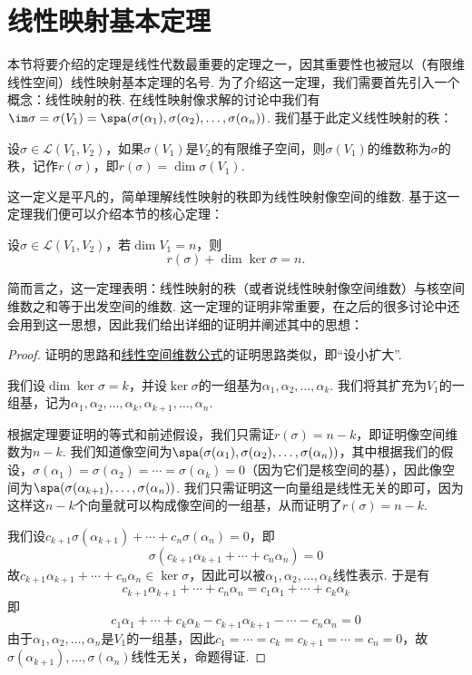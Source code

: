 \section{线性映射基本定理}

本节将要介绍的定理是线性代数最重要的定理之一，因其重要性也被冠以（有限维线性空间）线性映射基本定理的名号. 为了介绍这一定理，我们需要首先引入一个概念：线性映射的秩. 在线性映射像求解的讨论中我们有$\im \sigma=\sigma(V_1)=\spa(\sigma(\alpha_1),\sigma(\alpha_2),\ldots,\sigma(\alpha_n))$. 我们基于此定义线性映射的秩：
\begin{definition}
    设$\sigma\in \mathcal{L}(V_1,V_2)$，如果$\sigma(V_1)$是$V_2$的有限维子空间，则$\sigma(V_1)$的维数称为$\sigma$的秩，记作$r(\sigma)$，即$r(\sigma)=\dim \sigma(V_1)$.
\end{definition}

这一定义是平凡的，简单理解线性映射的秩即为线性映射像空间的维数. 基于这一定理我们便可以介绍本节的核心定理：

\begin{theorem}[线性映射基本定理]\label{thm:6:线性映射基本定理}
    设$\sigma \in \mathcal{L}(V_1,V_2)$，若$\dim V_1=n$，则
    \[r(\sigma)+\dim\ker\sigma=n.\]
\end{theorem}
简而言之，这一定理表明：线性映射的秩（或者说线性映射像空间维数）与核空间维数之和等于出发空间的维数. 这一定理的证明非常重要，在之后的很多讨论中还会用到这一思想，因此我们给出详细的证明并阐述其中的思想：

\begin{proof}
    证明的思路和\hyperref[thm:4:维数公式]{线性空间维数公式}的证明思路类似，即``设小扩大''.

    我们设$\dim\ker\sigma=k$，并设$\ker\sigma$的一组基为$\alpha_1,\alpha_2,\ldots,\alpha_k$. 我们将其扩充为$V_1$的一组基，记为$\alpha_1,\alpha_2,\ldots,\alpha_k,\alpha_{k+1},\ldots,\alpha_n$.

    根据定理要证明的等式和前述假设，我们只需证$r(\sigma)=n-k$，即证明像空间维数为$n-k$. 我们知道像空间为$\spa(\sigma(\alpha_1),\sigma(\alpha_2),\ldots,\sigma(\alpha_n))$，其中根据我们的假设，$\sigma(\alpha_1)=\sigma(\alpha_2)=\cdots=\sigma(\alpha_k)=0$（因为它们是核空间的基），因此像空间为$\spa(\sigma(\alpha_{k+1}),\ldots,\sigma(\alpha_n))$. 我们只需证明这一向量组是线性无关的即可，因为这样这$n-k$个向量就可以构成像空间的一组基，从而证明了$r(\sigma)=n-k$.

    我们设$c_{k+1}\sigma(\alpha_{k+1})+\cdots+c_n\sigma(\alpha_n)=0$，即
    \[\sigma(c_{k+1}\alpha_{k+1}+\cdots+c_n\alpha_n)=0\]
    故$c_{k+1}\alpha_{k+1}+\cdots+c_n\alpha_n \in \ker\sigma$，因此可以被$\alpha_1,\alpha_2,\ldots,\alpha_k$线性表示. 于是有
    \[c_{k+1}\alpha_{k+1}+\cdots+c_n\alpha_n=c_1\alpha_1+\cdots+c_k\alpha_k\]
    即
    \[c_1\alpha_1+\cdots+c_k\alpha_k-c_{k+1}\alpha_{k+1}-\cdots-c_n\alpha_n=0\]
    由于$\alpha_1,\alpha_2,\ldots,\alpha_n$是$V_1$的一组基，因此$c_1=\cdots=c_k=c_{k+1}=\cdots=c_n=0$，故$\sigma(\alpha_{k+1}),\ldots,\sigma(\alpha_n)$线性无关，命题得证.
\end{proof}

